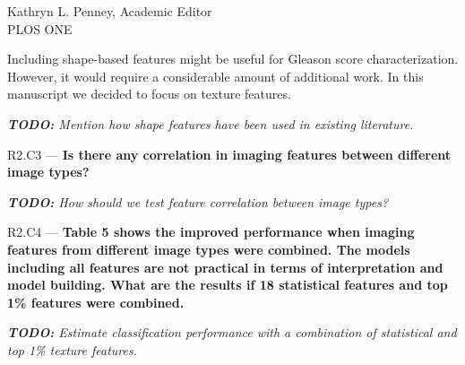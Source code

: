 \documentclass{letter}
\newcommand{\TODO}[1]{{\emph{\textbf{TODO:} #1}}}
\newenvironment{comment}[1]%
  {\vspace{5ex}\par\textsf{#1 ---}\ignorespaces\bfseries}%
  {\par\ignorespacesafterend}
\newenvironment{reply}%
  {\vspace{2ex}\par}%
  {\par\upshape}
\begin{document}
\begin{letter}{Kathryn L. Penney, Academic Editor \\ PLOS ONE}
\begin{reply}
Including shape-based features might be useful for Gleason score
characterization. However, it would require a considerable amount of additional
work. In this manuscript we decided to focus on texture features.

\TODO{Mention how shape features have been used in existing literature.}
\end{reply}


\begin{comment}{R2.C3}
Is there any correlation in imaging features between different image types?
\end{comment}

\begin{reply}
\TODO{How should we test feature correlation between image types?}
\end{reply}


\begin{comment}{R2.C4}
Table 5 shows the improved performance when imaging features from different
image types were combined. The models including all features are not practical
in terms of interpretation and model building. What are the results if 18
statistical features and top 1\% features were combined.
\end{comment}

\begin{reply}
\TODO{Estimate classification performance with a combination of statistical and
top 1\% texture features.}
\end{reply}



\end{letter}
\end{document}
